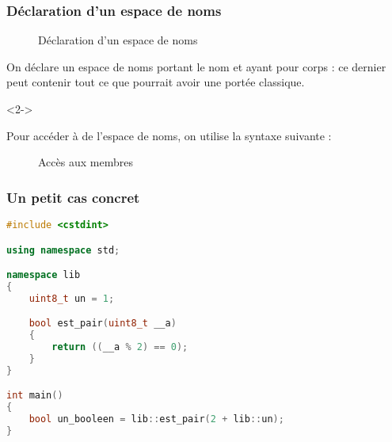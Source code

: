 \documentclass{cppcourses}
\begin{document}
\begin{frame}

\frametitle{Déclaration d'un espace de noms}

\begin{figure}
\caption{Déclaration d'un espace de noms}
\end{figure}

On déclare un espace de noms portant le nom \mykeyword{\textcolor{red}{identifiant}} et ayant pour corps \mykeyword{\textcolor{blue}{corps}} : ce dernier peut contenir tout ce que pourrait avoir une portée classique.

\begin{uncoverenv}<2->

Pour accéder à  de l'espace de noms, on utilise la syntaxe suivante :

\begin{figure}
\mykeyword{\textcolor{red}{<espace de noms>}::\textcolor{blue}{<membre>}}
\caption{Accès aux membres}
\end{figure}

\end{uncoverenv}

\end{frame}

\begin{frame}[fragile]

\frametitle{Un petit cas concret}

\begin{example}

\begin{lstlisting}[language = c++]
#include <cstdint>

using namespace std;

namespace lib
{
    uint8_t un = 1;

    bool est_pair(uint8_t __a)
    {
        return ((__a % 2) == 0);
    }
}

int main()
{
    bool un_booleen = lib::est_pair(2 + lib::un);
}
\end{lstlisting}

\end{example}

\end{frame}
\end{document}
